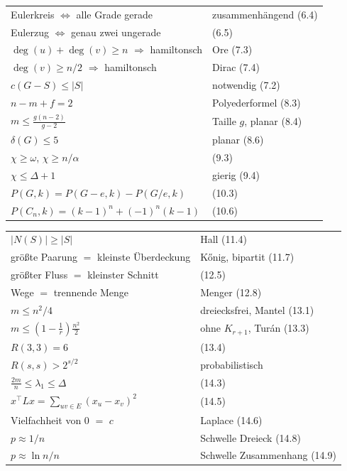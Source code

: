 \begin{merksatz}
\begin{center}
{\small
\renewcommand{\arraystretch}{1.55}
\begin{tabular}{@{}P{4.2cm}P{4.4cm}@{}}
\toprule
Eulerkreis $\iff$ alle Grade gerade & zusammenhängend (6.4)\\
Eulerzug $\iff$ genau zwei ungerade & (6.5)\\
$\deg(u)+\deg(v)\ge n$ $\Rightarrow$ hamiltonsch & Ore (7.3)\\
$\deg(v) \ge n/2$ $\Rightarrow$ hamiltonsch & Dirac (7.4)\\
$c(G-S) \le |S|$ & notwendig (7.2)\\
$n - m + f = 2$ & Polyederformel (8.3)\\
$m \le \frac{g(n-2)}{g-2}$ & Taille $g$, planar (8.4)\\
$\delta(G) \le 5$ & planar (8.6)\\
$\chi \ge \omega$, $\chi \ge n/\alpha$ & (9.3)\\
$\chi \le \Delta + 1$ & gierig (9.4)\\
$P(G,k) = P(G-e,k) - P(G/e,k)$ & (10.3)\\
$P(C_n,k) = (k-1)^n + (-1)^n(k-1)$ & (10.6)\\
\bottomrule
\end{tabular}}
\end{center}
\end{merksatz}

\begin{merksatz}
\begin{center}
{\small
\renewcommand{\arraystretch}{1.55}
\begin{tabular}{@{}P{4.2cm}P{4.4cm}@{}}
\toprule
$|N(S)| \ge |S|$ & Hall (11.4)\\
größte Paarung $=$ kleinste Überdeckung & Kőnig, bipartit (11.7)\\
größter Fluss $=$ kleinster Schnitt & (12.5)\\
Wege $=$ trennende Menge & Menger (12.8)\\
$m \le n^2/4$ & dreiecksfrei, Mantel (13.1)\\
$m \le (1-\frac1r)\frac{n^2}{2}$ & ohne $K_{r+1}$, Turán (13.3)\\
$R(3,3) = 6$ & (13.4)\\
$R(s,s) > 2^{s/2}$ & probabilistisch\\
$\frac{2m}{n} \le \lambda_1 \le \Delta$ & (14.3)\\
$x^{\!\top}Lx = \sum_{uv \in E}(x_u-x_v)^2$ & (14.5)\\
Vielfachheit von $0$ $=$ $c$ & Laplace (14.6)\\
$p \approx 1/n$ & Schwelle Dreieck (14.8)\\
$p \approx \ln n / n$ & Schwelle Zusammenhang (14.9)\\
\bottomrule
\end{tabular}}
\end{center}
\end{merksatz}

